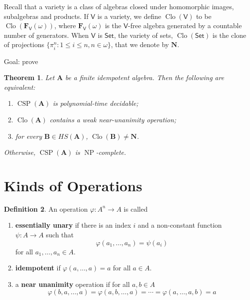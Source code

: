 \documentclass{amsart}
\theoremstyle{plain}
\newtheorem{theorem}{Theorem}[section]
\theoremstyle{definition}
\newtheorem{definition}[theorem]{Definition}
\theoremstyle{remark}
\def\phi{\varphi}
\DeclareMathOperator{\Clo}{Clo}
\DeclareMathOperator{\CSP}{CSP}
\DeclareMathOperator{\NP}{NP}
\begin{document}
Recall that a variety is a class of algebras closed under homomorphic images, subalgebras and products. 
If $\mathsf{V}$ is a variety, we define $\Clo(\mathsf{V})$ to be $\Clo(\mathbf{F}_\mathsf{V}(\omega))$, where $\mathbf{F}_\mathsf{V}(\omega)$ is the $\mathsf{V}$-free algebra generated by a countable number of generators.
When $\mathsf{V}$ is $\mathsf{Set}$, the variety of sets, $\Clo(\mathsf{Set})$ is the clone of projections $\{\pi^n_i: 1 \le i \le n, n \in \omega\}$, that we denote by $\mathbf{N}$. 

Goal: prove 

\begin{theorem}
    Let $\mathbf{A}$ be a finite 
    idempotent 
    algebra. 
    Then the following are equivalent: 
    \begin{enumerate}
        \item $\CSP(\mathbf{A})$ is polynomial-time decidable; 
        \item $\Clo(\mathbf{A})$ contains a weak near-unanimity operation; 
        \item for every $\mathbf{B} \in HS(\mathbf{A})$, $\Clo(\mathbf{B}) \neq \mathbf{N}$. 
    \end{enumerate}
    Otherwise, $\CSP(\mathbf{A})$ is $\NP$-complete. 
\end{theorem}

\section{Kinds of Operations}

\begin{definition}
    An operation $\phi: A^n \to A$ is called 
    \begin{enumerate}
        \item \textbf{essentially unary} if there is an index $i$ and a non-constant function $\psi: A \to A$ such that 
        \begin{equation*}
        \phi(a_1, \ldots, a_n) = \psi(a_i)
        \end{equation*}
        for all $a_1, \ldots, a_n \in A$. 
        \item \textbf{idempotent} if $\phi(a, \ldots, a)=a$ for all $a \in A$. 
        \item a \textbf{near unanimity} operation if for all $a,b \in A$ 
        \begin{equation*}
            \phi(b, a, \ldots, a) = \phi(a, b, \ldots, a) = \cdots = \phi(a, \ldots, a, b)= a 
        \end{equation*}
    \end{enumerate}
\end{definition}
\end{document}
